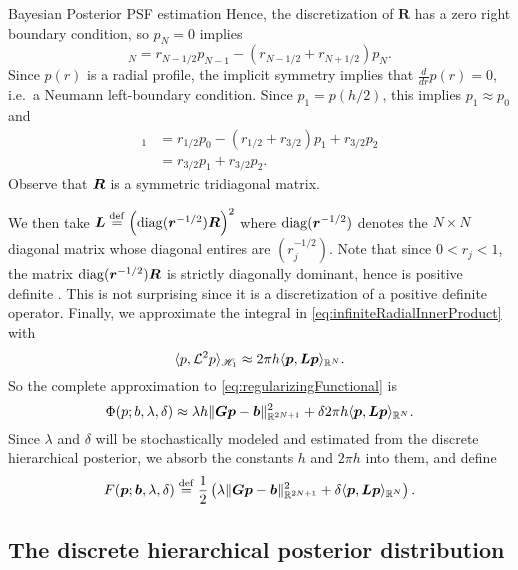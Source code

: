 \begin{chapter}{Bayesian Posterior PSF estimation}
Hence, the discretization of $\bm R$ has a zero right boundary condition, so $p_{N}= 0$ implies
\begin{equation}
  [\vect R\vect p]_N = r_{N-1/2}p_{N-1} - (r_{N-1/2}+r_{N+1/2})p_N.
\end{equation}
Since $p(r)$ is a radial profile, the implicit symmetry implies that $\frac d{dr}p(r) = 0$, i.e.~a Neumann left-boundary condition. 
Since $p_1 = p( h/2 )$, this implies $p_1 \approx p_{0}$ and
\begin{align}
  [\vect R\vect p]_1 &= r_{1/2}p_0 - (r_{1/2}+r_{3/2})p_1 + r_{3/2}p_{2} \nonumber\\
  &= r_{3/2}p_1 + r_{3/2}p_{2}.
\end{align}
Observe that $\mbox{\boldmath$R$}$ is a symmetric tridiagonal matrix.

We then take $\mbox{\boldmath$L$} \stackrel{\rm def}{=} \Big(\mathrm{diag}(\mbox{\boldmath$r$}^{-1/2}) \mbox{\boldmath$R$}\Big)^2$ where $\mathrm{diag}(\mbox{\boldmath$r$}^{-1/2})$ denotes the $N\times N$ diagonal matrix whose diagonal entires are $(r_j^{-1/2})$.
Note that since $0<r_j<1$, the matrix $\mathrm{diag}(\mbox{\boldmath$r$}^{-1/2}) \mbox{\boldmath$R$}$ is strictly diagonally dominant, hence is positive definite \citep[Theorem 3.4.3]{golub2012matrix}.
This is not surprising since it is a discretization of a positive definite operator.
Finally, we approximate the integral in \eqref{eq:infiniteRadialInnerProduct} with 
\begin{equation}\label{eq:psfDiscInvProblem}
  \langle p, \mathcal L^2 p\rangle_{\mathscr H_1} \approx 2\pi h \langle \mbox{\boldmath$p$}, \mbox{\boldmath$L$} \mbox{\boldmath$p$}\rangle_{\mathbb R^N}.
\end{equation}
So the complete approximation to \eqref{eq:regularizingFunctional} is
\begin{equation} \label{eq:discreteRegularizingFunctional}
  \Phi(p; b,\lambda,\delta) \approx \lambda h \|\mbox{\boldmath$G$}\mbox{\boldmath$p$} - \mbox{\boldmath$b$}\|_{\mathbb R^{2N+1}}^2 + \delta 2\pi h\langle \mbox{\boldmath$p$}, \mbox{\boldmath$L$} \mbox{\boldmath$p$}\rangle_{\mathbb R^N}.
\end{equation}
Since $\lambda$ and $\delta$ will be stochastically modeled and estimated from the discrete hierarchical posterior, we absorb the constants $h$ and $2\pi h$ into them, and define
\begin{equation} \label{discreteRegularizingFunctional}
  F(\mbox{\boldmath$p$}; \mbox{\boldmath$b$},\lambda,\delta) \stackrel{\rm def}{=} \frac 12\left(\lambda \|\mbox{\boldmath$G$}\mbox{\boldmath$p$} - \mbox{\boldmath$b$}\|_{\mathbb R^{2N+1}}^2 + \delta \langle \mbox{\boldmath$p$}, \mbox{\boldmath$L$} \mbox{\boldmath$p$}\rangle_{\mathbb R^N}\right).
\end{equation}
\subsection{The discrete hierarchical posterior distribution}


\end{chapter}
